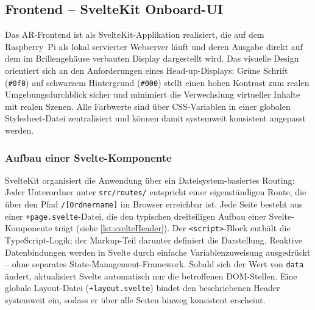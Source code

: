 \subsection{Frontend -- SvelteKit Onboard-UI}
\label{subsec:frontendImpl}

Das AR-Frontend ist als SvelteKit-Applikation realisiert, die auf dem
Raspberry~Pi als lokal servierter Webserver läuft und deren Ausgabe direkt
auf dem im Brillengehäuse verbauten Display dargestellt wird.
Das visuelle Design orientiert sich an den Anforderungen eines
Head-up-Displays: Grüne Schrift (\texttt{\#0f0}) auf schwarzem Hintergrund
(\texttt{\#000}) stellt einen hohen Kontrast zum realen Umgebungsdurchblick
sicher und minimiert die Verwechslung virtueller Inhalte mit realen Szenen.
Alle Farbwerte sind über CSS-Variablen in einer globalen Stylesheet-Datei
zentralisiert und können damit systemweit konsistent angepasst werden.

\subsubsection{Aufbau einer Svelte-Komponente}
\label{subsubsec:svelteAufbau}

SvelteKit organisiert die Anwendung über ein Dateisystem-basiertes Routing:
Jeder Unterordner unter \texttt{src/routes/} entspricht einer eigenständigen
Route, die über den Pfad \texttt{/[Ordnername]} im Browser erreichbar ist.
Jede Seite besteht aus einer \texttt{+page.svelte}-Datei, die den typischen
dreiteiligen Aufbau einer Svelte-Komponente trägt (siehe \ref{lst:svelteHeader}).
Der \texttt{<script>}-Block enthält die TypeScript-Logik; der Markup-Teil darunter
definiert die Darstellung.
Reaktive Datenbindungen werden in Svelte durch einfache Variablenzuweisung
ausgedrückt -- ohne separates State-Management-Framework.
Sobald sich der Wert von \texttt{data} ändert, aktualisiert Svelte automatisch
nur die betroffenen DOM-Stellen.
Eine globale Layout-Datei (\texttt{+layout.svelte}) bindet den beschriebenen
Header systemweit ein, sodass er über alle Seiten hinweg konsistent erscheint.

